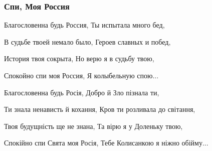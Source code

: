  
 
 

\subsubsection{Спи, Моя Россия}

Благословенна будь Россия,
Ты испытала много бед,

В судьбе твоей немало было,
Героев славных и побед,

История твоя сокрыта,
Но верю я в судьбу твою,

Спокойно спи моя Россия,
Я колыбельную спою...

Благословенна будь Росія,
Добро й Зло пізнала ти,

Ти знала ненависть й кохання,
Кров ти розливала до світання,

Твоя будущність ще не знана,
Та вірю я у Доленьку твою,

Спокійно спи Свята моя Росія,
Тебе Колисанкою я ніжно обійму...

